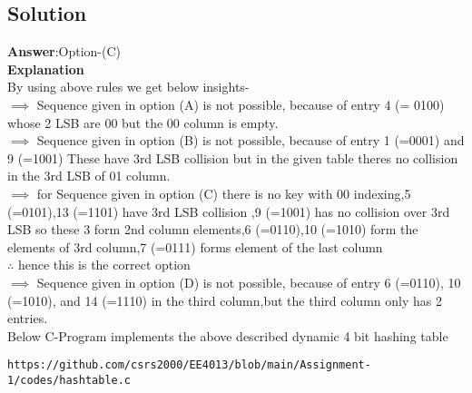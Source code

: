 \documentclass[journal,12pt,twocolumn]{IEEEtran}
\begin{document}
\subsection{Solution}
\textbf{Answer}:Option-(C)
\\
\textbf{Explanation}\\
By using above rules we get below insights-\\
$\implies$ Sequence given in option (A) is not possible, because of entry 4 (= 0100) whose 2 LSB are 00 but the 00 column is empty.\\
$\implies$ Sequence given in option (B) is not possible, because of entry 1 (=0001) and 9 (=1001) These have 3rd LSB collision but in the given table theres no collision in the 3rd LSB of 01 column.\\
$\implies$ for Sequence given in option (C) there is no key with 00 indexing,5 (=0101),13 (=1101) have 3rd LSB collision ,9 (=1001) has no collision over 3rd LSB so these 3 form 2nd column elements,6 (=0110),10 (=1010) form the elements of 3rd column,7 (=0111) forms element of the last column\\ $\therefore$ hence this is the correct option\\
$\implies$ Sequence given in option (D) is not possible, because of entry 6 (=0110), 10 (=1010), and 14 (=1110) in the third column,but the third column only has 2 entries.\\
Below C-Program implements the above described dynamic 4 bit hashing table
\begin{lstlisting}
https://github.com/csrs2000/EE4013/blob/main/Assignment-1/codes/hashtable.c
\end{lstlisting}
\end{document}
